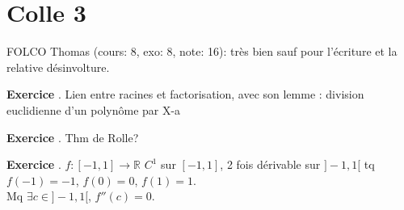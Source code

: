 \documentclass[10pt,a4paper]{article}
\newcounter{question}
\newcounter{exo}
\newenvironment{exo}{\vspace{0.5cm}\setcounter{question}{0}\addtocounter{exo}{1} \noindent \textbf{Exercice \theexo}. \normalsize }{\par}
\begin{document}
	\section*{Colle 3}
	\setcounter{exo}{0}
	FOLCO Thomas (cours: 8, exo: 8, note: 16): très bien sauf pour l'écriture et la relative désinvolture.\\
	
	\begin{exo}
		Lien entre racines et factorisation, avec son lemme : division euclidienne d'un polynôme par X-a
	\end{exo}		
	
	\begin{exo}
		Thm de Rolle?
	\end{exo}
	
	\begin{exo}
		$f : [-1, 1] \longrightarrow \mathbb{R}$ $C^1$ sur $[-1, 1]$, 2 fois dérivable sur $]-1, 1[$ tq $f(-1) = -1$, $f(0) = 0$, $f(1) = 1$.\\
		Mq $\exists c \in ]-1, 1[$, $f''(c) = 0$.
	\end{exo}	
\end{document}
